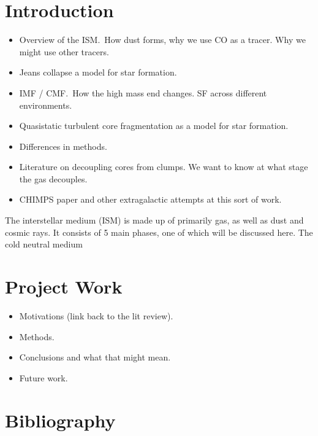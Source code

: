 \documentclass[a4paper,11pt]{article}
\begin{document}


\section*{Introduction}

\begin{itemize}
    \item Overview of the ISM.\ How dust forms, why we use CO as a tracer. Why we might use other tracers.
    \item Jeans collapse a model for star formation. 
    \item IMF / CMF.\ How the high mass end changes. SF across different environments.
    \item Quasistatic turbulent core fragmentation as a model for star formation.
    \item Differences in methods.
    \item Literature on decoupling cores from clumps. We want to know at what stage the gas decouples.
    \item CHIMPS paper and other extragalactic attempts at this sort of work.
\end{itemize}

\par\noindent The interstellar medium (ISM) is made up of primarily gas, as well as dust and cosmic rays. It consists of 5 main phases, one of which will be discussed here. The cold neutral medium 


\section*{Project Work}

\begin{itemize}
    \item Motivations (link back to the lit review).
    \item Methods.
    \item Conclusions and what that might mean.
    \item Future work. 
\end{itemize}

\par\noindent


\par\noindent\cite{SEDIGISM}

\section*{Bibliography}
\printbibliography[heading=none]
\end{document}

